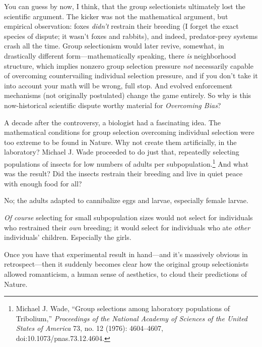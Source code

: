  You can guess by now, I think, that the group selectionists
ultimately lost the scientific argument. The kicker was not the
mathematical argument, but empirical observation: foxes
\textit{didn't} restrain their breeding (I forget the
exact species of dispute; it wasn't foxes and rabbits),
and indeed, predator-prey systems crash all the time. Group
selectionism would later revive, somewhat, in drastically different
form---mathematically speaking, there \textit{is} neighborhood
structure, which implies nonzero group selection pressure \textit{not}
necessarily capable of overcoming countervailing individual selection
pressure, and if you don't take it into account your
math will be wrong, full stop. And evolved enforcement mechanisms (not
originally postulated) change the game entirely. So why is this
now-historical scientific dispute worthy material for
\textit{Overcoming Bias}?


 A decade after the controversy, a biologist had a fascinating
idea. The mathematical conditions for group selection overcoming
individual selection were too extreme to be found in Nature. Why not
create them artificially, in the laboratory? Michael J. Wade proceeded
to do just that, repeatedly selecting populations of insects for low
numbers of adults per subpopulation.\footnote{Michael J. Wade, ``Group selections among
laboratory populations of Tribolium,''
\textit{Proceedings of the National Academy of Sciences of the United
States of America} 73, no. 12 (1976): 4604--4607,
doi:10.1073/pnas.73.12.4604.} And what was
the result? Did the insects restrain their breeding and live in quiet
peace with enough food for all?


 No; the adults adapted to cannibalize eggs and larvae, especially
female larvae.


 \textit{Of course} selecting for small subpopulation sizes would
not select for individuals who restrained their \textit{own} breeding;
it would select for individuals who ate \textit{other}
individuals' children. Especially the girls.


 Once you have that experimental result in hand---and
it's massively obvious in retrospect---then it suddenly
becomes clear how the original group selectionists allowed romanticism,
a human sense of aesthetics, to cloud their predictions of Nature.


